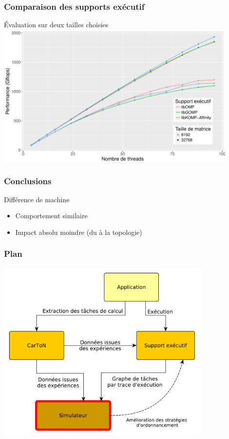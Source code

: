 \documentclass[xcolor={usenames,dvipsnames,svgnames,table}, aspectratio=43]{beamer}
\begin{document}
\begin{frame}
  \frametitle{Comparaison des supports exécutif}
  Évaluation sur deux tailles choisies
  \includegraphics[width=0.9\textwidth]{graph/graph_all_cholesky_brunch.pdf}
\end{frame}

\begin{frame}
  \frametitle{Conclusions}

  \begin{block}{Différence de machine}
    \begin{itemize}
      \item Comportement similaire
      \item Impact absolu moindre (du à la topologie)
    \end{itemize}
  \end{block}

\end{frame}


\begin{frame}
  \frametitle{Plan}
  \includegraphics[width=0.8\textwidth]{graph/big_picture-part3.pdf}
\end{frame}
\end{document}
